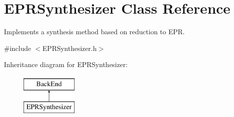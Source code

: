 \hypertarget{classEPRSynthesizer}{\section{E\-P\-R\-Synthesizer Class Reference}
\label{classEPRSynthesizer}
}


Implements a synthesis method based on reduction to E\-P\-R.  




{\ttfamily \#include $<$E\-P\-R\-Synthesizer.\-h$>$}

Inheritance diagram for E\-P\-R\-Synthesizer\-:\begin{figure}[H]
\begin{center}
\leavevmode
\includegraphics[height=2.000000cm]{classEPRSynthesizer}
\end{center}
\end{figure}
